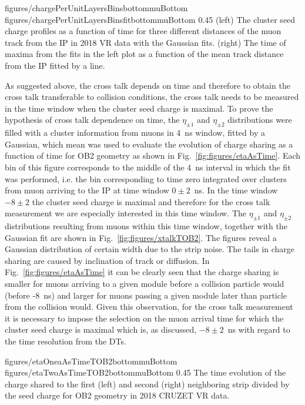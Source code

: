                  {figures/chargePerUnitLayersBinsbottommuBottom}
                 {figures/chargePerUnitLayersBinsfitbottommuBottom}
                 {0.45}       %
                 {(left) The cluster seed charge profiles as a function of time for three different distances of the muon track from the IP in 2018 VR data with the Gaussian fits. (right) The time of maxima from the fits in the left plot as a function of the mean track distance from the IP fitted by a line. }

As suggested above, the cross talk depends on time and therefore to obtain the cross talk transferable to collision conditions, the cross talk needs to be measured in the time window when the cluster seed charge is maximal. To prove the hypothesis of cross talk dependence on time, the $\eta_{\pm 1}$ and $\eta_{\pm 2}$ distributions were filled with a cluster information from muons in 4~ns window, fitted by a Gaussian, which mean was used to evaluate the evolution of charge sharing as a function of time for OB2 geometry as shown in Fig.~\ref{fig:figures/etaAsTime}. Each bin of this figure corresponds to the middle of the 4~ns interval in which the fit was performed, i.e. the bin corresponding to time zero integrated over clusters from muon arriving to the IP at time window $0 \pm 2$~ns. In the time window $-8 \pm 2$ the cluster seed charge is maximal and therefore for the cross talk measurement we are especially interested in this time window. The  $\eta_{\pm 1}$ and $\eta_{\pm 2}$ distributions resulting from muons within this time window, together with the Gaussian fit are shown in Fig.~\ref{fig:figures/xtalkTOB2}. The figures reveal a Gaussian distribution of certain width due to the strip noise. The tails in charge sharing are caused by inclination of track or diffusion. In Fig.~\ref{fig:figures/etaAsTime} it can be clearly seen that the charge sharing is smaller for muons arriving to a given module before a collision particle would (before -8~ns) and larger for muons passing a given module later than particle from the collision would. Given this observation, for the cross talk measurement it is necessary to impose the selection on the muon arrival time for which the cluster seed charge is maximal which is, as discussed, $-8 \pm 2$~ns with regard to the time resolution from the DTs.


                 {figures/etaOneaAsTimeTOB2bottommuBottom}
                 {figures/etaTwoAsTimeTOB2bottommuBottom} %
                 {0.45}       %
                 { The time evolution of the charge shared to the first (left) and second (right) neighboring strip divided by the seed charge for OB2 geometry in 2018 CRUZET VR data.}

